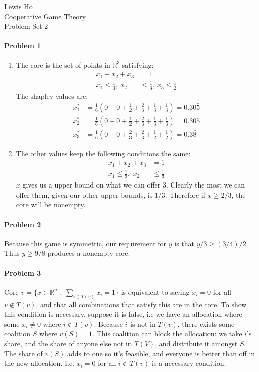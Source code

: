 \documentclass[12pt]{article}
\begin{document}
\begin{center}
  Lewis Ho\\
  Cooperative Game Theory\\
  Problem Set 2
\end{center}

\paragraph{Problem 1}
\begin{enumerate}[label=\alph*)]
\item The core is the set of points in $\mathbb{R}^3$ satisfying:
  \begin{align*}
    x_1 + x_2 + x_3 &= 1\\
    x_1 \leq \frac{1}{3},\ 
    x_2 &\leq \frac{1}{3},\ 
    x_3 \leq \frac{1}{2}
  \end{align*}
The shapley values are:
\begin{align*}
  x^*_1 &= \frac{1}{6}(0 + 0 + \frac{1}{2} + \frac{2}{3} + \frac{1}{3} + \frac{1}
          {3}) = 0.30\bar{5}\\
  x^*_2 &= \frac{1}{6}(0 + 0 + \frac{1}{2} + \frac{2}{3} + \frac{1}{3} + \frac{1}
          {3}) = 0.30\bar{5}\\
  x^*_3 &= \frac{1}{6}(0 + 0 + \frac{2}{3} + \frac{2}{3} + \frac{1}{2} + \frac{1}
          {2}) = 0.3\bar{8}
\end{align*}
\item The other values keep the following conditions the same:
  \begin{align*}
    x_1 + x_2 + x_3 &= 1\\
    x_1 \leq \frac{1}{3},\ 
    x_2 &\leq \frac{1}{3}
  \end{align*}
  $x$ gives us a upper bound on what we can offer 3. Clearly the most we can
  offer them, given our other upper bounds, is 1/3. Therefore if $x \geq 2/3$,
  the core will be nonempty.
\end{enumerate}

\paragraph{Problem 2}
Because this game is symmetric, our requirement for $y$ is that $y/3 \geq
(3/4)/2$. Thus $y \geq 9/8$ produces a nonempty core.

\paragraph{Problem 3}
Core $v = \{x\in \mathbb{R}^n_+\ :\ \sum_{i\in T(v)}x_i = 1\}$ is equivalent to
saying $x_i = 0$ for all $v\notin T(v)$, and that all combinations that satisfy
this are in the core. To show this condition is necessary, suppose it is false,
i.e we have an allocation where some $x_i \neq 0$ where $i\notin T(v)$. Because
$i$ is not in $T(v)$, there exists some coalition $S$ where $v(S) = 1$. This
coalition can block the allocation: we take $i$'s share, and the share of
anyone else not in $T(V)$, and distribute it amongst $S$. The share of $v(S)$
adds to one so it's feasible, and everyone is better than off in the new
allocation. I.e. $x_i = 0$ for all $i \notin T(v)$ is a necessary condition.
\end{document}
